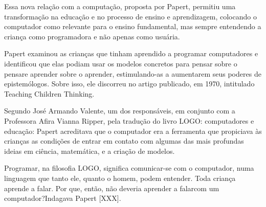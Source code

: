 \documentclass[
12pt,		%
openright,	%
twoside,  %
a4paper,			%
chapter=TITLE,		%
english,			%
french,				%
spanish,			%
brazil				%
]{USPSC-classe/USPSC}
\begin{document}
\noindent\begin{center}\mbox{\centering{}}\end{center}


Essa nova rela\c{c}\~ao com a computa\c{c}\~ao, proposta por Papert, permitiu uma transforma\c{c}\~ao na educa\c{c}\~ao e no processo de ensino e aprendizagem, colocando o computador como relevante para o ensino fundamental, mas sempre entendendo a crian\c{c}a como programadora e n\~ao apenas como usu\'aria.









Papert examinou as crian\c{c}as que tinham aprendido a programar computadores e identificou que elas podiam usar os modelos concretos para \textquotedbl pensar sobre o pensar\textquotedbl  e \textquotedbl aprender sobre o aprender\textquotedbl  [XXX], estimulando-as  a aumentarem seus poderes de epistem\'ologos. Sobre isso, ele discorreu no artigo publicado, em 1970, intitulado Teaching Children Thinking.









Segundo Jos\'e Armando Valente, um dos respons\'aveis, em conjunto com a Professora Afira Vianna Ripper, pela tradu\c{c}\~ao do livro LOGO: computadores e educa\c{c}\~ao: \textquotedbl Papert acreditava que o computador era a ferramenta que propiciava \`as crian\c{c}as as condi\c{c}\~oes de entrar em contato com algumas das mais profundas ideias em ci\^encia, matem\'atica, e a cria\c{c}\~ao de modelos\textquotedbl .









Programar, na filosofia LOGO, significa \textquotedbl comunicar-se com o computador, numa linguagem que tanto ele, quanto o homem,  podem entender\textquotedbl . Toda crian\c{c}a aprende a falar. Por que, ent\~ao, n\~ao deveria aprender a \textquotedbl falar\textquotedbl  com um computador?\textquotedbl  Indagava Papert [XXX].
\end{document}
